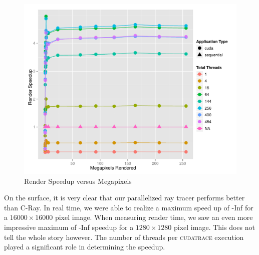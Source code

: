 \documentclass[12pt]{article}
\begin{document}
\begin{figure}
    \caption{Render Speedup versus Megapixels} \label{fig:render_speedup}
    \begin{center}
\includegraphics{cudatrace-005}
    \end{center}
\end{figure}

On the surface, it is very clear that our parallelized ray tracer performs better than C-Ray. In real time, we were able to realize a maximum speed up of -Inf for a $16000\times 16000$ pixel image. When measuring render time, we saw an even more impressive maximum of -Inf speedup for a $1280 \times 1280$ pixel image. This does not tell the whole story however. The number of threads per \textsc{cudatrace} execution played a significant role in determining the speedup.
\end{document}
